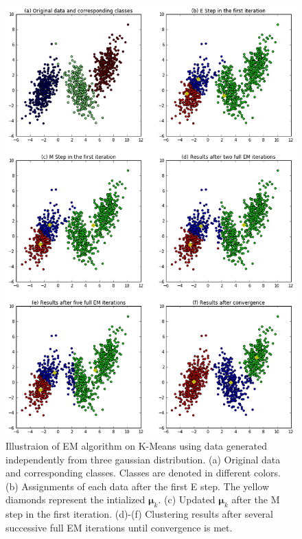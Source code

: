\begin{figure}
	\begin{center}
		\includegraphics[width=\textwidth]{images/EM4KMeans.png}
		\caption{Illustraion of EM algorithm on K-Means using data generated independently from three gaussian distribution. (a) Original data and corresponding classes. Classes are denoted in different colors. (b) Assignments of each data after the first E step. The yellow diamonds represent the intialized \(\boldsymbol{\mu}_k\). (c) Updated \(\boldsymbol{\mu}_k\) after the M step in the first iteration. (d)-(f) Clustering results after several successive full EM iterations until convergence is met.}
		\label{fig:EM4KMeans}
	\end{center}
\end{figure}

